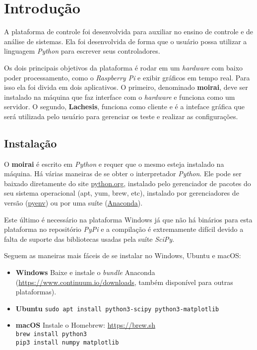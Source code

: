 
\chapter{Introdução}%
\label{chapter:introduction}

A plataforma de controle foi desenvolvida para auxiliar no ensino de controle e
de análise de sistemas. Ela foi desenvolvida de forma que o usuário possa
utilizar a linguagem \textit{Python} para escrever seus controladores.

Os dois principais objetivos da plataforma é rodar em um \textit{hardware} com
baixo poder processamento, como o \textit{Raspberry Pi} e exibir gráficos em
tempo real. Para isso ela foi divida em dois aplicativos. O primeiro, denominado
\textbf{moirai}, deve ser instalado na máquina que faz interface com o
\textit{hardware} e funciona como um servidor. O segundo, \textbf{Lachesis},
funciona como cliente e é a inteface gráfica que será utilizada pelo usuário
para gerenciar os teste e realizar as configurações.

\section{Instalação}
\label{sec:installation}

O \textbf{moirai} é escrito em \textit{Python} e requer que o mesmo esteja
instalado na máquina. Há várias maneiras de se obter o interpretador
\textit{Python}. Ele pode ser baixado diretamente do site
\href{https://www.python.org}{python.org}, instalado pelo gerenciador de pacotes
do seu sistema operacional (apt, yum, brew, etc), instalado por gerenciadores de
versão (\href{https://github.com/pyenv/pyenv}{pyenv}) ou por uma suíte
(\href{https://www.continuum.io/downloads}{Anaconda}).

Este último é necessário na plataforma Windows já que não há binários para esta
plataforma no repositório \textit{PyPi} e a compilação é extremamente difícil
devido a falta de suporte das bibliotecas usadas pela suíte \textit{SciPy}.

Seguem as maneiras mais fáceis de se instalar no Windows, Ubuntu e macOS:

\begin{itemize}
\item \textbf{Windows}
        Baixe e instale o \textit{bundle} Anaconda
        (\url{https://www.continuum.io/downloads}, também disponível para outras
        plataformas).

\item \textbf{Ubuntu}
        \texttt{sudo apt install python3-scipy python3-matplotlib}

\item \textbf{macOS}
        Instale o Homebrew: \url{https://brew.sh}\\
        \texttt{brew install python3}\\
        \texttt{pip3 install numpy matplotlib}
\end{itemize}

